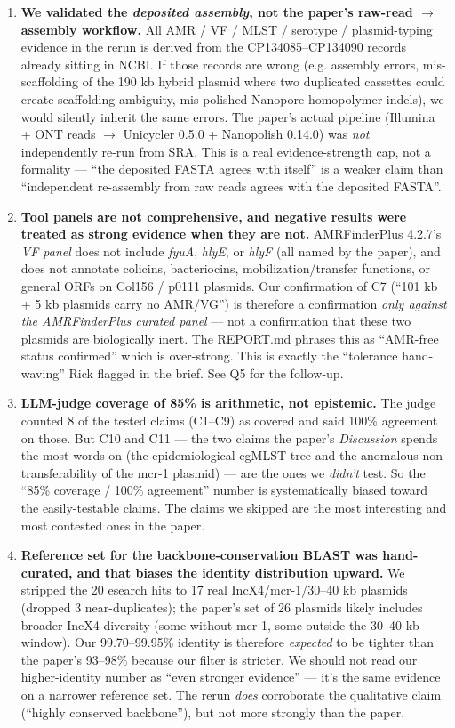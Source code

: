 \documentclass[11pt]{article}
\begin{document}
\begin{enumerate}
  \item \textbf{We validated the \emph{deposited assembly}, not the paper's raw-read $\to$ assembly workflow.} All AMR / VF / MLST / serotype / plasmid-typing evidence in the rerun is derived from the CP134085--CP134090 records already sitting in NCBI. If those records are wrong (e.g. assembly errors, mis-scaffolding of the 190 kb hybrid plasmid where two duplicated cassettes could create scaffolding ambiguity, mis-polished Nanopore homopolymer indels), we would silently inherit the same errors. The paper's actual pipeline (Illumina + ONT reads $\to$ Unicycler 0.5.0 + Nanopolish 0.14.0) was \emph{not} independently re-run from SRA. This is a real evidence-strength cap, not a formality --- ``the deposited FASTA agrees with itself'' is a weaker claim than ``independent re-assembly from raw reads agrees with the deposited FASTA''.

  \item \textbf{Tool panels are not comprehensive, and negative results were treated as strong evidence when they are not.} AMRFinderPlus 4.2.7's \emph{VF panel} does not include \emph{fyuA}, \emph{hlyE}, or \emph{hlyF} (all named by the paper), and does not annotate colicins, bacteriocins, mobilization/transfer functions, or general ORFs on Col156 / p0111 plasmids. Our confirmation of C7 (``101 kb + 5 kb plasmids carry no AMR/VG'') is therefore a confirmation \emph{only against the AMRFinderPlus curated panel} --- not a confirmation that these two plasmids are biologically inert. The REPORT.md phrases this as ``AMR-free status confirmed'' which is over-strong. This is exactly the ``tolerance hand-waving'' Rick flagged in the brief. See Q5 for the follow-up.

  \item \textbf{LLM-judge coverage of 85\% is arithmetic, not epistemic.} The judge counted 8 of the tested claims (C1--C9) as covered and said 100\% agreement on those. But C10 and C11 --- the two claims the paper's \emph{Discussion} spends the most words on (the epidemiological cgMLST tree and the anomalous non-transferability of the mcr-1 plasmid) --- are the ones we \emph{didn't} test. So the ``85\% coverage / 100\% agreement'' number is systematically biased toward the easily-testable claims. The claims we skipped are the most interesting and most contested ones in the paper.

  \item \textbf{Reference set for the backbone-conservation BLAST was hand-curated, and that biases the identity distribution upward.} We stripped the 20 esearch hits to 17 real IncX4/mcr-1/30--40 kb plasmids (dropped 3 near-duplicates); the paper's set of 26 plasmids likely includes broader IncX4 diversity (some without mcr-1, some outside the 30--40 kb window). Our 99.70--99.95\% identity is therefore \emph{expected} to be tighter than the paper's 93--98\% because our filter is stricter. We should not read our higher-identity number as ``even stronger evidence'' --- it's the same evidence on a narrower reference set. The rerun \emph{does} corroborate the qualitative claim (``highly conserved backbone''), but not more strongly than the paper.


\end{enumerate}
\end{document}
